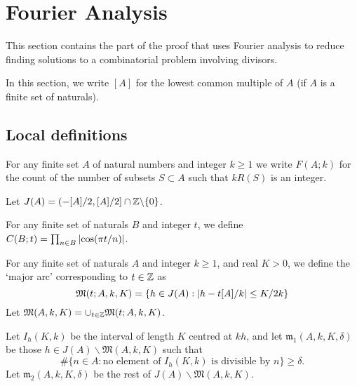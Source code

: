 \chapter{Fourier Analysis}
\label{chap:fourier}

This section contains the part of the proof that uses Fourier analysis to reduce finding solutions to a combinatorial problem involving divisors.

In this section, we write $[A]$ for the lowest common multiple of $A$ (if $A$ is a finite set of naturals).
\section{Local definitions}

\begin{definition}
  \label{def:integer_count}
  \leanok
For any finite set $A$ of natural numbers and integer $k\geq 1$ we write $F(A;k)$ for the count of the number of subsets $S\subset A$ such that $kR(S)$ is an integer.
\end{definition}

\begin{definition}
  \label{def:j}
  \leanok
  Let $J(A) = (-[A]/2,[A]/2]\cap\mathbb{Z} \backslash \{0\}$.
\end{definition}

\begin{definition}
  \label{def:cos_prod}
  \leanok
  For any finite set of naturals $B$ and integer $t$, we define $C(B;t) = \prod_{n\in B}\left\lvert \cos(\pi t/n)\right\rvert$.
\end{definition}

\begin{definition}
  \label{def:major_arc}
  \leanok
  For any finite set of naturals $A$ and integer $k\geq 1$, and real $K>0$, we define the `major arc' corresponding to $t\in\mathbb{Z}$ as
\[\mathfrak{M}(t;A,k,K) = \{ h\in  J(A): \left\lvert h-t[A]/k\right\rvert\leq K/2k\}\]
  Let $\mathfrak{M}(A,k,K) = \cup_{t\in \mathbb{Z}}\mathfrak{M}(t;A,k,K)$.
\end{definition}

\begin{definition}
  \label{def:minor_arcs}
  \leanok
Let $I_h(K,k)$ be the interval of length $K$ centred at $kh$, and let $\mathfrak{m}_1(A,k,K,\delta)$ be those $h\in J(A)\backslash \mathfrak{M}(A,k,K)$ such that
\[\# \{ n\in A : \textrm{no element of }I_h(K,k)\textrm{ is divisible by }n\}\geq \delta.\]
Let $\mathfrak{m}_2(A,k,K,\delta)$ be the rest of $J(A)\backslash\mathfrak{M}(A,k,K)$.
\end{definition}

